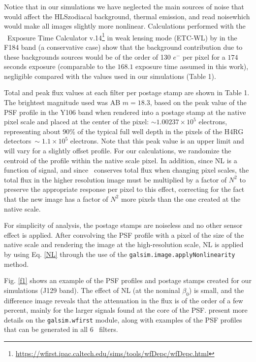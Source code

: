 \documentclass[11pt,preprint,flushrt]{aastex}
\begin{document}
Notice that in our simulations we have neglected the main sources of noise that would affect the HLS\textemdash zodiacal background, thermal emission, and read noise\textemdash which would make all images slightly more nonlinear. Calculations performed with the \wfa\ Exposure Time Calculator v.14\footnote{\url{https://wfirst.ipac.caltech.edu/sims/tools/wfDepc/wfDepc.html}} \citep{hirata12} in weak lensing mode (ETC-WL) by \citealt{spergel15} in the F184 band (a conservative case) show that the background contribution due to these backgrounds sources would be of the order of 130 $e^-$ per pixel for a $174$ seconds exposure (comparable to the $168.1$ exposure time assumed in this work), negligible compared with the values used in our simulations (Table 1).

Total and peak flux values at each filter per postage stamp are shown in Table 1. The brightest magnitude used was AB $m=18.3$, based on the peak value of the PSF profile in the Y106 band when rendered into a postage stamp at the native pixel scale and placed at the center of the pixel: $\sim 1.00237\times10^{5}$ electrons, representing about $90\%$ of the typical full well depth in the pixels of the H4RG detectors\textemdash$\ \sim1.1\times10^{5}$ electrons. Note that this peak value is an upper limit and will vary for a slightly offset profile. For our calculations, we randomize the centroid of the profile within the native scale pixel. In addition, since NL is a function of signal, and since \gs\ conserves total flux when changing pixel scales, the total flux in the higher resolution image must be multiplied by a factor of $N^2$ to preserve the appropriate response per pixel to this effect, correcting for the fact that the new image has a factor of $N^2$ more pixels than the one created at the native scale. 

For simplicity of analysis, the postage stamps are noiseless and no other sensor effect is applied. After convolving the PSF profile with a pixel of the size of the native scale and rendering the image at the high-resolution scale, NL is applied by using Eq. \ref{NL} through the use of the {\tt{galsim.image.applyNonlinearity}} method. 

Fig. \ref{f1} shows an example of the PSF profiles and postage stamps created for our simulations (J129 band). The effect of NL (at the nominal $\beta_0$) is small, and the difference image reveals that the attenuation in the flux is of the order of a few percent, mainly for the larger signals found at the core of the PSF.  \citealt{kannawadi15} present more details on the {\tt{galsim.wfirst}} module, along with examples of the PSF profiles that can be generated in all 6 \wfa\ filters. 
\end{document}
